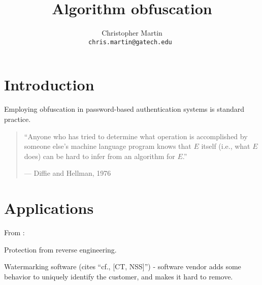 \documentclass[10pt,twocolumn]{article}
\title{Algorithm obfuscation}
\date{}
\author{
  \begin{tabular}{c c c}
    Christopher Martin \\
    \small \tt{chris.martin@gatech.edu}
  \end{tabular}
}
\begin{document}
  \thispagestyle{empty}


  \section{Introduction}

    Employing obfuscation in password-based authentication systems is standard practice.

    \begin{quote}
      ``Anyone who has tried to determine what operation is accomplished by someone else's machine language
      program knows that $E$ itself (i.e., what $E$ does) can be hard to infer from an algorithm for $E$.''

      \hfill --- Diffie and Hellman, 1976 \cite{newDirections}
    \end{quote}


  \section{Applications}

    From \cite{onThe(Im)possibility}:

    Protection from reverse engineering.

    Watermarking software (cites ``cf., [CT, NSS]'') -
    software vendor adds some behavior to uniquely identify the
    customer, and makes it hard to remove.
\end{document}
